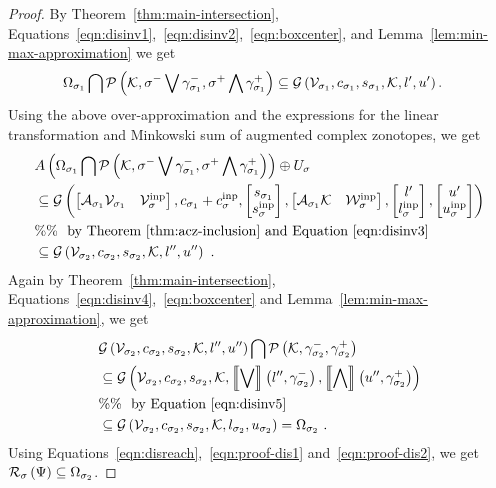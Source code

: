\begin{proof}
By Theorem~\ref{thm:main-intersection},
Equations~\ref{eqn:disinv1},~\ref{eqn:disinv2},~\ref{eqn:boxcenter},
and Lemma~\ref{lem:min-max-approximation} we get
%
\begin{align*}
& \Omega_{\sigma_1}\bigcap\mathcal{P}\left(\mathcal{K},\sigma^-\bigvee \gamma_{\sigma_1}^-,\sigma^+\bigwedge \gamma_{\sigma_1}^+\right)
\subseteq \mathcal{G}\left(\mathcal{V}_{\sigma_1},c_{\sigma_1},s_{\sigma_1},\mathcal{K},l^\prime,u^\prime\right).
\end{align*}
%
Using the above over-approximation and the expressions for the linear
transformation and Minkowski sum of augmented complex zonotopes, we
get
%
\begin{align}
& A\left(\Omega_{\sigma_1}\bigcap\mathcal{P}\left(\mathcal{K},\sigma^-\bigvee \gamma_{\sigma_1}^-,\sigma^+\bigwedge \gamma_{\sigma_1}^+\right)\right)\oplus U_{\sigma}\nonumber\\
& \subseteq \mathcal{G}\left(
\left[\begin{matrix}\mathcal{A}_{\sigma_1}\mathcal{V}_{\sigma_1} & \mathcal{V}^{\operatorname{inp}}_\sigma\end{matrix}\right]
,
c_{\sigma_1}+c^{\operatorname{inp}}_\sigma
,
\left[\begin{matrix}s_{\sigma_1}\\ s^{\operatorname{inp}}_\sigma\end{matrix}\right]
,
\left[\begin{matrix}\mathcal{A}_{\sigma_1}\mathcal{K} & \mathcal{W}^{\operatorname{inp}}_\sigma\end{matrix}\right]
,
\left[\begin{matrix}l^\prime\\l^{\operatorname{inp}}_\sigma\end{matrix}\right]
,
\left[\begin{matrix}u^\prime\\ u^{\operatorname{inp}}_\sigma\end{matrix}\right]
\right)\nonumber\\
& \%\%~~\text{by Theorem~\ref{thm:acz-inclusion} and Equation~\ref{eqn:disinv3}}\nonumber\\
& \subseteq \mathcal{G}\left(\mathcal{V}_{\sigma_2},c_{\sigma_2},s_{\sigma_2},\mathcal{K},l^{\prime\prime},u^{\prime\prime}\right)~\label{eqn:proof-dis1}.
\end{align}
%
Again by Theorem~\ref{thm:main-intersection},
Equations~\ref{eqn:disinv4},~\ref{eqn:boxcenter} and Lemma~\ref{lem:min-max-approximation}, we get
%
\begin{align}
& \mathcal{G}\left(\mathcal{V}_{\sigma_2},c_{\sigma_2},s_{\sigma_2},\mathcal{K},l^{\prime\prime},u^{\prime\prime}\right)\bigcap\mathcal{P}\left(\mathcal{K},\gamma_{\sigma_2}^-,\gamma_{\sigma_2}^+\right)\nonumber\\
& \subseteq \mathcal{G}\left(\mathcal{V}_{\sigma_2},c_{\sigma_2},s_{\sigma_2},\mathcal{K},\left\llbracket\bigvee\right\rrbracket\left(l^{\prime\prime},\gamma_{\sigma_2}^-\right),\left\llbracket\bigwedge\right\rrbracket\left(u^{\prime\prime},\gamma_{\sigma_2}^+\right)\right)\nonumber\\
& \%\%~~\text{by Equation~\ref{eqn:disinv5}}\nonumber\\
& \subseteq \mathcal{G}\left(\mathcal{V}_{\sigma_2},c_{\sigma_2},s_{\sigma_2},\mathcal{K},l_{\sigma_2},u_{\sigma_2}\right)=\Omega_{\sigma_2}~\label{eqn:proof-dis2}.
\end{align}
%
Using Equations~\ref{eqn:disreach},~\ref{eqn:proof-dis1}
and~\ref{eqn:proof-dis2}, we get $\mathcal{R}_{\sigma}\left(\Psi\right)
\subseteq \Omega_{\sigma_2}$.
\end{proof}
